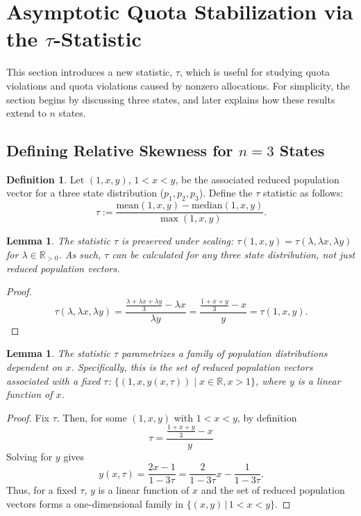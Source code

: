 \documentclass[11pt]{article}
\newtheorem{lemma}[theorem]{Lemma}
\theoremstyle{definition}
\newtheorem{definition}[theorem]{Definition}
\theoremstyle{definition}
\begin{document}
\section{Asymptotic Quota Stabilization via the $\tau$-Statistic}

This section introduces a new statistic, $\tau$, which is useful for studying quota violations and quota violations caused by nonzero allocations. For simplicity, the section begins by discussing three states, and later explains how these results extend to $n$ states.

\subsection{Defining Relative Skewness for $n=3$ States}

\begin{definition}\label{tau_def} Let $(1,x,y)$, $1<x<y$, be the associated reduced population vector for a three state distribution ($p_1, p_2, p_3$). Define the $\tau$ statistic as follows: 
$$ \tau := \frac{\mathrm{mean}(1,x,y)-\mathrm{median}(1,x,y)}{\max(1,x,y)}. $$
\end{definition}
\begin{lemma}\label{tau=proportional}
The statistic $\tau$ is preserved under scaling: $\tau (1,x,y) = \tau (\lambda , \lambda x, \lambda y)$ for $\lambda \in \mathbb{R}_{>0}$. As such, $\tau$ can be calculated for any three state distribution, not just reduced population vectors.
\end{lemma}

\begin{proof}
$$\tau(\lambda,\lambda x,\lambda y)= \frac{\frac{\lambda + \lambda x+ \lambda y}{3} - \lambda x}{\lambda y} =\frac{ \frac{1+x+y}{3} - x}{y} =\tau(1,x,y). $$
\end{proof}

\begin{lemma}\label{tau_family} The statistic $\tau$ parametrizes a family of population distributions dependent on $x$. Specifically, this is the set of reduced population vectors associated with a fixed $\tau$: $\{ (1,x,y(x,\tau)) \mid x \in \mathbb{R}, x>1 \}$, where $y$ is a linear function of $x$. \end{lemma}
\begin{proof} 
Fix $\tau$. Then, for some $(1,x,y)$ with $1<x<y$, by definition
$$ \tau= \frac{ \frac{1+x+y}{3} - x}{y} $$
Solving for $y$ gives
$$ y(x,\tau)= \frac{2x-1}{1-3\tau} = \frac{2}{1-3\tau}x - \frac{1}{1-3\tau}. $$
Thus, for a fixed $\tau$, $y$ is a linear function of $x$ and  the set of reduced population vectors forms a one-dimensional family in $\{(x, y)\, |\, 1<x<y\}$.
\end{proof}
\end{document}
